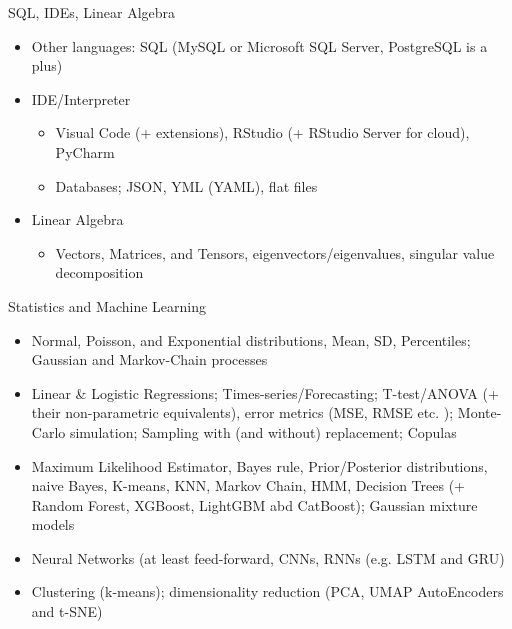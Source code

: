 \documentclass[compress,brown]{beamer}
\begin{document}
\begin{frame}{SQL, IDEs, Linear Algebra}	
		\begin{itemize}
			\item Other languages: SQL (MySQL or Microsoft SQL Server, PostgreSQL is a plus)
			\item IDE/Interpreter
			\begin{itemize}
				\item Visual Code (+ extensions), RStudio (+ RStudio Server for cloud), PyCharm
				\item Databases; JSON, YML (YAML), flat files
			\end{itemize}
		\end{itemize}
	
		\begin{itemize}
	\item Linear Algebra
	\begin{itemize}
		\item Vectors, Matrices, and Tensors, eigenvectors/eigenvalues, singular value decomposition
	\end{itemize}
\end{itemize}		
	\end{frame}

\begin{frame}{Statistics and Machine Learning}	

		\begin{itemize}
			\item Normal, Poisson, and Exponential distributions, Mean, SD, Percentiles; Gaussian and Markov-Chain processes
			\item Linear \& Logistic Regressions; Times-series/Forecasting; T-test/ANOVA (+ their non-parametric equivalents), error metrics (MSE, RMSE etc. ); Monte-Carlo simulation; Sampling with (and without) replacement; Copulas
			\item Maximum Likelihood Estimator, Bayes rule, Prior/Posterior distributions, naive Bayes, K-means, KNN, Markov Chain, HMM, Decision Trees (+ Random Forest, XGBoost, LightGBM abd CatBoost); Gaussian mixture models
			\item Neural Networks (at least feed-forward, CNNs, RNNs (e.g. LSTM and GRU)
			\item Clustering (k-means); dimensionality reduction (PCA, UMAP AutoEncoders and t-SNE)
		\end{itemize}
	
\end{frame}
\end{document}
